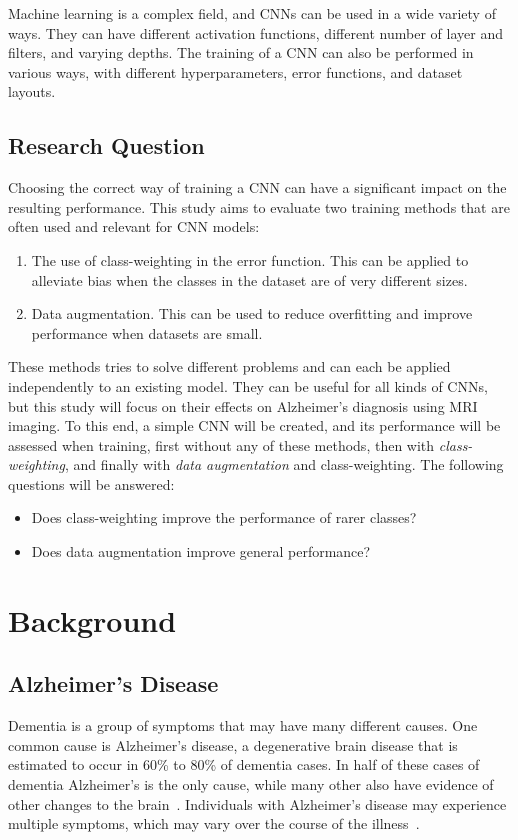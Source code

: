 \documentclass{kththesis}
\begin{document}
Machine learning is a complex field, and CNNs can be used in a wide variety of ways. They can have different activation functions, different number of layer and filters, and varying depths. The training of a CNN can also be performed in various ways, with different hyperparameters, error functions, and dataset layouts.

\section{Research Question}
Choosing the correct way of training a CNN can have a significant impact on the resulting performance. This study aims to evaluate two training methods that are often used and relevant for CNN models:
\begin{enumerate}
	\item{The use of class-weighting in the error function. This can be applied to alleviate bias when the classes in the dataset are of very different sizes.}
	\item{Data augmentation. This can be used to reduce overfitting and improve performance when datasets are small.}
\end{enumerate}
These methods tries to solve different problems and can each be applied independently to an existing model. They can be useful for all kinds of CNNs, but this study will focus on their effects on Alzheimer's diagnosis using MRI imaging. To this end, a simple CNN will be created, and its performance will be assessed when training, first without any of these methods, then with \textit{class-weighting}, and finally with \textit{data augmentation} and class-weighting. The following questions will be answered:

\begin{itemize}
\item{Does class-weighting improve the performance of rarer classes?}
\item{Does data augmentation improve general performance?}
\end{itemize}

\chapter{Background}

\section{Alzheimer's Disease}

Dementia is a group of symptoms that may have many different causes. One common cause is Alzheimer's disease, a degenerative brain disease that is estimated to occur in 60\% to 80\% of dementia cases. In half of these cases of dementia Alzheimer's is the only cause, while many other also have evidence of other changes to the brain~\cite{factsfigures2018}.
Individuals with Alzheimer's disease may experience multiple symptoms, which may vary over the course of the illness~\cite{factsfigures2018}.
\end{document}
